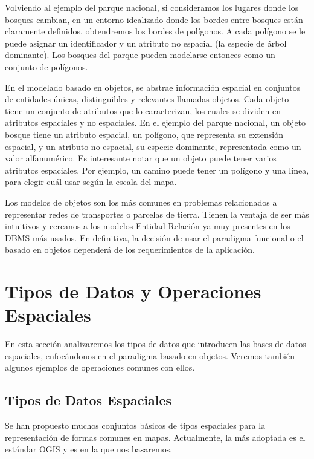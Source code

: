 Volviendo al ejemplo del parque nacional, si consideramos los lugares donde los bosques cambian,
en un entorno idealizado donde los bordes entre bosques están claramente definidos, obtendremos los bordes de polígonos.
A cada polígono se le puede asignar un identificador y un atributo no espacial (la especie de árbol dominante).
Los bosques del parque pueden modelarse entonces como un conjunto de polígonos.

En el modelado basado en objetos, se abstrae información espacial en conjuntos de
entidades únicas, distinguibles y relevantes llamadas objetos.
Cada objeto tiene un conjunto de atributos que lo caracterizan, los cuales se dividen en atributos espaciales y no espaciales.
En el ejemplo del parque nacional, un objeto bosque tiene un atributo espacial, un polígono, que representa su extensión espacial,
y un atributo no espacial, su especie dominante, representada como un valor alfanumérico.
Es interesante notar que un objeto puede tener varios atributos espaciales.
Por ejemplo, un camino puede tener un polígono y una línea, para elegir cuál usar según la escala del mapa.

Los modelos de objetos son los más comunes en problemas relacionados a representar redes de transportes o parcelas de tierra.
Tienen la ventaja de ser más intuitivos y cercanos a los modelos Entidad-Relación ya muy presentes en los DBMS más usados.
En definitiva, la decisión de usar el paradigma funcional o el basado en objetos dependerá de los requerimientos de la aplicación.

\section{Tipos de Datos y Operaciones Espaciales} \label{sec:s:sdt}

En esta sección analizaremos los tipos de datos que introducen las bases de datos espaciales, enfocándonos en el paradigma basado en objetos. Veremos también algunos ejemplos de operaciones comunes con ellos.

\subsection{Tipos de Datos Espaciales}

Se han propuesto muchos conjuntos básicos de tipos espaciales para la representación de formas comunes en mapas. Actualmente, la más adoptada es el estándar OGIS\textsuperscript{\cite{99opengis}} y es en la que nos basaremos.

